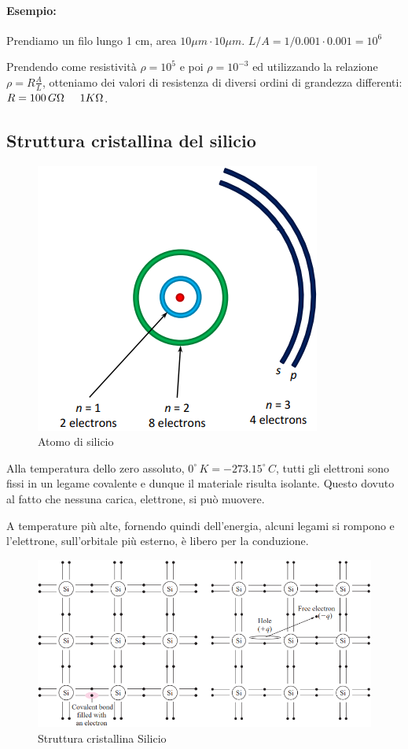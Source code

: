 \paragraph{Esempio:} Prendiamo un filo lungo 1 cm, area $10\mu m \cdot 10\mu m$. $L/A = 1/0.001\cdot0.001 = 10^6$

Prendendo come resistività $\rho = 10^5$ e poi $\rho = 10^{-3}$ ed utilizzando la relazione $\rho = R \frac{A}{L}$, otteniamo dei valori di resistenza di diversi ordini di grandezza differenti: $R = 100\,G\Omega \hspace{0.5cm} 1K\Omega$.

\newpage
\subsection{Struttura cristallina del silicio}
\begin{figure}[htbp]
    \centering
    \includegraphics[width=0.35\linewidth]{img/silicio.png}
    \caption{Atomo di silicio}
    
\end{figure}

Alla temperatura dello zero assoluto, $0^{\circ}\,K = -273.15^{\circ}\,C$, tutti gli elettroni sono fissi in un legame covalente e dunque il materiale risulta isolante. Questo dovuto al fatto che nessuna carica, elettrone, si può muovere.

A temperature più alte, fornendo quindi dell'energia, alcuni legami si rompono e l'elettrone, sull'orbitale più esterno, è libero per la conduzione.


\begin{figure}[htbp]
    \centering
    \includegraphics[width=0.8\linewidth]{img/legameSilicio.png}
    \caption{Struttura cristallina Silicio}    
\end{figure}


